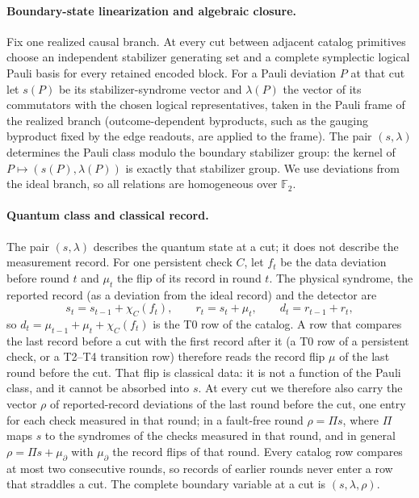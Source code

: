 \documentclass[aps,prx,reprint,superscriptaddress,nofootinbib,floatfix,longbibliography]{revtex4-2}
\theoremstyle{definition}
\begin{document}
\paragraph{Boundary-state linearization and algebraic closure.}
Fix one realized causal branch.  At every cut between adjacent catalog
primitives choose an independent stabilizer generating set and a complete
symplectic logical Pauli basis for every retained encoded block.  For a Pauli
deviation $P$ at that cut let $s(P)$ be its stabilizer-syndrome vector and
$\lambda(P)$ the vector of its commutators with the chosen logical
representatives, taken in the Pauli frame of the realized branch (outcome-dependent
byproducts, such as the gauging byproduct fixed by the edge readouts, are
applied to the frame).  The pair $(s,\lambda)$ determines the Pauli class
modulo the boundary stabilizer group: the kernel of $P\mapsto(s(P),\lambda(P))$
is exactly that stabilizer group.  We use deviations from the ideal branch, so
all relations are homogeneous over $\mathbb F_2$.

\paragraph{Quantum class and classical record.}
The pair $(s,\lambda)$ describes the quantum state at a cut; it does not
describe the measurement record.  For one persistent check $C$, let $f_t$ be
the data deviation before round $t$ and $\mu_t$ the flip of its record in
round $t$.  The physical syndrome, the reported record (as a deviation from
the ideal record) and the detector are
\begin{equation}
 s_t=s_{t-1}+\chi_C(f_t),\qquad r_t=s_t+\mu_t,\qquad d_t=r_{t-1}+r_t,
 \tag{A15-rec}
\end{equation}
so $d_t=\mu_{t-1}+\mu_t+\chi_C(f_t)$ is the T0 row of the catalog.  A row that
compares the last record before a cut with the first record after it (a T0
row of a persistent check, or a T2--T4 transition row) therefore reads the
record flip $\mu$ of the last round before the cut.  That flip is classical
data: it is not a function of the Pauli class, and it cannot be absorbed into
$s$.  At every cut we therefore also carry the vector $\rho$ of reported-record
deviations of the last round before the cut, one entry for each check measured
in that round; in a fault-free round $\rho=\Pi s$, where $\Pi$ maps $s$ to the
syndromes of the checks measured in that round, and in general
$\rho=\Pi s+\mu_\partial$ with $\mu_\partial$ the record flips of that round.  Every
catalog row compares at most two consecutive rounds, so records of earlier
rounds never enter a row that straddles a cut.  The complete boundary
variable at a cut is $(s,\lambda,\rho)$.
\end{document}
